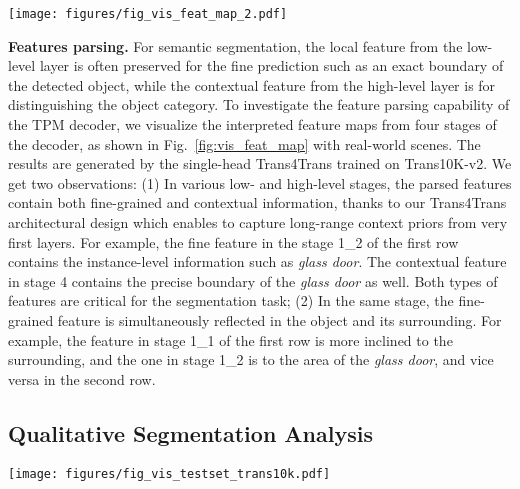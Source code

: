\documentclass[journal]{IEEEtran}
\begin{document}
\begin{figure*}[!t]
    \centering
    \texttt{[image: figures/fig\_vis\_feat\_map\_2.pdf]}
\caption{\small Visualization of feature maps, corresponding to four different stages in the TPM decoder. The two feature maps from the same stage (stage 1\_1 and stage 1\_2) indicate the global and local activated features of transparent objects.}
    \label{fig:vis_feat_map}
\end{figure*}

\noindent \textbf{Features parsing.}
For semantic segmentation, the local feature from the low-level layer is often preserved for the fine prediction such as an exact boundary of the detected object, while the contextual feature from the high-level layer is for distinguishing the object category. 
To investigate the feature parsing capability of the TPM decoder, we visualize the interpreted feature maps from four stages of the decoder, as shown in Fig.~\ref{fig:vis_feat_map} with real-world scenes. The results are generated by the single-head Trans4Trans trained on Trans10K-v2. We get two observations: (1) In various low- and high-level stages, the parsed features contain both fine-grained and contextual information, thanks to our Trans4Trans architectural design which enables to capture long-range context priors from very first layers. For example, the fine feature in the stage 1\_2 of the first row contains the instance-level information such as \emph{glass door}. The contextual feature in stage 4 contains the precise boundary of the \emph{glass door} as well. Both types of features are critical for the segmentation task; (2) In the same stage, the fine-grained feature is simultaneously reflected in the object and its surrounding. For example, the feature in stage 1\_1 of the first row is more inclined to the surrounding, and the one in stage 1\_2 is to the area of the \emph{glass door}, and vice versa in the second row.

\subsection{Qualitative Segmentation Analysis}
\label{sec:qualitative}

\begin{figure*}[!ht]
    \centering
    \texttt{[image: figures/fig\_vis\_testset\_trans10k.pdf]}
\caption{\small Qualitative analysis on Trans10K-v2 test set. (a) shows some negative predictions from both models. In (b), our Trans4Trans can correctly segment those cases failed by Trans2Seg. In (c) and (d), our results are more precise.
    }
    \label{fig:vis_testset}
\end{figure*}
\end{document}
